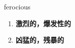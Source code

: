 
\begin{frame}
{\huge ferocious}
\begin{center}
\begin{enumerate}\Large
  \item \textbf{激烈的，爆发性的}
  \item \textbf{凶猛的，残暴的}
\end{enumerate}
\end{center}
\end{frame}
